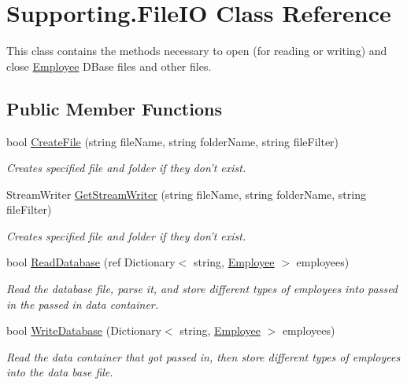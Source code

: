 \hypertarget{class_supporting_1_1_file_i_o}{\section{Supporting.\-File\-I\-O Class Reference}
\label{class_supporting_1_1_file_i_o}
}


This class contains the methods necessary to open (for reading or writing) and close \hyperlink{namespace_employee}{Employee} D\-Base files and other files.  


\subsection*{Public Member Functions}
\begin{DoxyCompactItemize}
\item 
bool \hyperlink{class_supporting_1_1_file_i_o_add590b89b02ab30214efb1d184ebdced}{Create\-File} (string file\-Name, string folder\-Name, string file\-Filter)
\begin{DoxyCompactList}\small\item\em Creates specified file and folder if they don't exist. \end{DoxyCompactList}\item 
Stream\-Writer \hyperlink{class_supporting_1_1_file_i_o_aa2107a951a106b513da728a1c5184cf8}{Get\-Stream\-Writer} (string file\-Name, string folder\-Name, string file\-Filter)
\begin{DoxyCompactList}\small\item\em Creates specified file and folder if they don't exist. \end{DoxyCompactList}\item 
bool \hyperlink{class_supporting_1_1_file_i_o_a1ff12544e3eb1b3f3bc53fb3b91cd614}{Read\-Database} (ref Dictionary$<$ string, \hyperlink{class_all_employees_1_1_employee}{Employee} $>$ employees)
\begin{DoxyCompactList}\small\item\em Read the database file, parse it, and store different types of employees into passed in the passed in data container. \end{DoxyCompactList}\item 
bool \hyperlink{class_supporting_1_1_file_i_o_aaf04c6df9d39b8d649dfc73727400041}{Write\-Database} (Dictionary$<$ string, \hyperlink{class_all_employees_1_1_employee}{Employee} $>$ employees)
\begin{DoxyCompactList}\small\item\em Read the data container that got passed in, then store different types of employees into the data base file. \end{DoxyCompactList}\end{DoxyCompactItemize}


